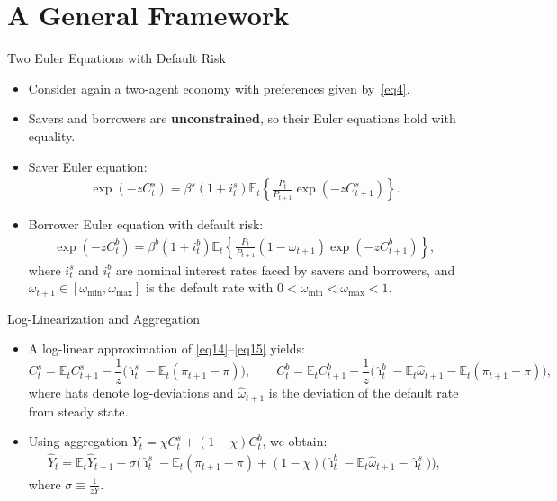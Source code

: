 \documentclass[11pt,aspectratio=169]{beamer}
\newcommand{\E}{\mathbb{E}}
\begin{document}
\section{A General Framework}

\begin{frame}{Two Euler Equations with Default Risk}
\small
\begin{itemize}
  \item Consider again a two-agent economy with preferences given by~\eqref{eq4}.
  \item Savers and borrowers are \textbf{unconstrained}, so their Euler equations hold with equality.
  \vspace{0.25em}
  \item Saver Euler equation:
  \begin{align}
    \exp(-zC_t^s)
    =\beta^s(1+i_t^s)\E_t\!\left\{\frac{P_t}{P_{t+1}}\exp(-zC_{t+1}^s)\right\}.
    \label{eq14}
  \end{align}
  \item Borrower Euler equation with default risk:
  \begin{align}
    \exp(-zC_t^b)
    =\beta^b(1+i_t^b)\E_t\!\left\{\frac{P_t}{P_{t+1}}(1-\omega_{t+1})\exp(-zC_{t+1}^b)\right\},
    \label{eq15}
  \end{align}
  where $i_t^s$ and $i_t^b$ are nominal interest rates faced by savers and borrowers, and $\omega_{t+1}\in[\omega_{\min},\omega_{\max}]$ is the default rate with
  $0<\omega_{\min}<\omega_{\max}<1$.
\end{itemize}
\end{frame}

\begin{frame}{Log-Linearization and Aggregation}
\small
\begin{itemize}
  \item A log-linear approximation of \eqref{eq14}--\eqref{eq15} yields:
  \[
    C_t^s=\E_t C_{t+1}^s-\frac{1}{z}\Big(\hat{\imath}_t^s-\E_t(\pi_{t+1}-\pi)\Big),
    \qquad
    C_t^b=\E_t C_{t+1}^b-\frac{1}{z}\Big(\hat{\imath}_t^b-\E_t\hat{\omega}_{t+1}-\E_t(\pi_{t+1}-\pi)\Big),
  \]
  where hats denote log-deviations and $\hat\omega_{t+1}$ is the deviation of the default rate from steady state.
  \vspace{0.25em}
  \item Using aggregation $Y_t=\chi C_t^s+(1-\chi)C_t^b$, we obtain:
  \begin{align}
    \hat{Y}_t
    =\E_t\hat{Y}_{t+1}
    -\sigma\Big(
      \hat{\imath}_t^s-\E_t(\pi_{t+1}-\pi)
      +(1-\chi)\big(\hat{\imath}_t^b-\E_t\hat{\omega}_{t+1}-\hat{\imath}_t^s\big)
    \Big),
    \label{eq16}
  \end{align}
  where $\sigma\equiv \frac{1}{zY}$.
\end{itemize}
\end{frame}
\end{document}
